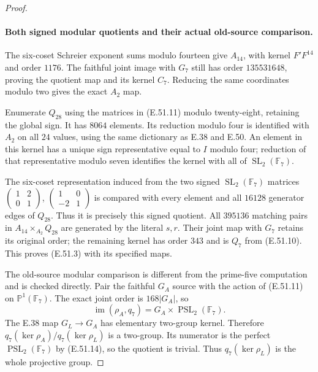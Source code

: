 \begin{proof}
\paragraph{Both signed modular quotients and their actual old-source comparison.}
The six-coset Schreier exponent sums modulo fourteen
give $A_{14}$, with kernel $F'F^{14}$ and order $1176$.
The faithful joint image with $G_7$ still has order
$135531648$, proving the quotient map and its kernel
$C_7$.  Reducing the same coordinates modulo two gives
the exact $A_2$ map.

Enumerate $Q_{28}$ using the matrices in
\textup{(E.51.11)} modulo twenty-eight, retaining the
global sign.  It has $8064$ elements.  Its reduction
modulo four is identified with $A_2$ on all $24$ values,
using the same dictionary as E.38 and E.50.  An element
in this kernel has a unique sign representative equal
to $I$ modulo four; reduction of that representative
modulo seven identifies the kernel with all of
$\operatorname{SL}_2(\mathbb F_7)$.

The six-coset representation induced from the two
signed $\operatorname{SL}_2(\mathbb F_7)$ matrices
$\left(\begin{smallmatrix}1&2\\0&1\end{smallmatrix}\right)$,
$\left(\begin{smallmatrix}1&0\\-2&1\end{smallmatrix}\right)$
is compared with every element and all $16128$
generator edges of $Q_{28}$.  Thus it is precisely
this signed quotient.  All $395136$ matching pairs
in $A_{14}\times_{A_2}Q_{28}$ are generated by the
literal $s,r$.  Their joint map with $G_7$ retains
its original order; the remaining kernel has
order $343$ and is $Q_7$ from
\textup{(E.51.10)}.  This proves
\textup{(E.51.3)} with its specified maps.

The old-source modular comparison is different from
the prime-five computation and is checked directly.
Pair the faithful $G_A$ source with the action of
\textup{(E.51.11)} on $\mathbb P^1(\mathbb F_7)$.
The exact joint order is $168|G_A|$, so
\[
       \operatorname{im}(\rho_A,q_7)
           =G_A\times\operatorname{PSL}_2(\mathbb F_7).
\tag{E.51.14}
\]
The E.38 map $G_L\to G_A$ has elementary two-group
kernel.  Therefore
$q_7(\ker\rho_A)/q_7(\ker\rho_L)$ is a two-group.
Its numerator is the perfect
$\operatorname{PSL}_2(\mathbb F_7)$ by
\textup{(E.51.14)}, so the quotient is trivial.
Thus $q_7(\ker\rho_L)$ is the whole projective group.


\end{proof}
